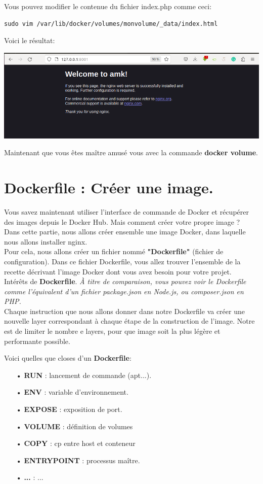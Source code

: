 \documentclass[12pt,a4paper]{article}
\begin{document}
Vous pouvez modifier le contenue du fichier index.php comme ceci:
\begin{verbatim}
sudo vim /var/lib/docker/volumes/monvolume/_data/index.html
\end{verbatim}
Voici le résultat:
\begin{center}
\includegraphics[scale=0.3]{img/docker_volume_n.png}
\end{center}
Maintenant que vous êtes maître amusé vous avec la commande
\textbf{docker volume}.

\section{Dockerfile : Créer une image.}
Vous savez maintenant utiliser l'interface de commande de Docker et récupérer des images depuis le Docker Hub. Mais comment créer votre propre image ?\\
Dans cette partie, nous allons créer ensemble une image Docker, dans laquelle nous allons installer nginx.\\
Pour cela, nous allons créer un fichier nommé \textbf{"Dockerfile"} (fichier de configuration). Dans ce fichier Dockerfile, vous allez trouver l'ensemble de la recette décrivant l'image Docker dont vous avez besoin pour votre projet.\\
Intérêts de \textbf{Dockerfile}.
\textit{À titre de comparaison, vous pouvez voir le Dockerfile comme l'équivalent d'un fichier package.json en Node.js, ou composer.json en PHP. } \\
Chaque instruction que nous allons donner dans notre Dockerfile va créer une nouvelle layer correspondant à chaque étape de la construction de l'image.
Notre est de limiter le nombre e layers, pour que image soit la plus légère et performante possible.

Voici quelles que closes d'un \textbf{Dockerfile}:
\begin{itemize}
\item[•] \textbf{RUN} : lancement de commande (apt...).
\item[•] \textbf{ENV} : variable d'environnement.
\item[•] \textbf{EXPOSE} : exposition de port.
\item[•] \textbf{VOLUME} : définition de volumes
\item[•] \textbf{COPY} : cp entre host et conteneur
\item[•] \textbf{ENTRYPOINT} : processus maître.
\item[•] \textbf{...} : ...
\end{itemize}
\end{document}
